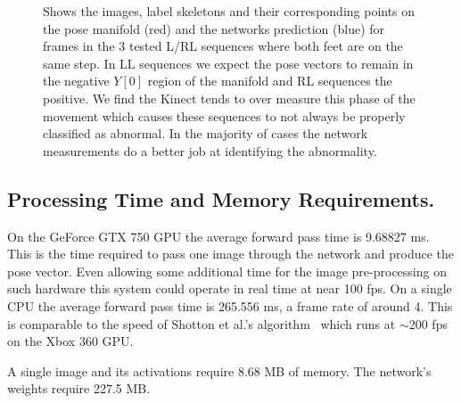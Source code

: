 \documentclass[11pt]{article} %
\begin{document}
\begin{figure}
\qquad%
\caption{Shows the images, label skeletons and their corresponding points on the pose manifold (red) and the networks prediction (blue) for frames in the 3 tested L/RL sequences where both feet are on the same step. In LL sequences we expect the pose vectors to remain in the negative $Y[0]$ region of the manifold and RL sequences the positive. We find the Kinect tends to over measure this phase of the movement which causes these sequences to not always be properly classified as abnormal. In the majority of cases the network measurements do a better job at identifying the abnormality. }
\label{fig:lrlOverMeasure}
\end{figure}


\subsection{Processing Time and Memory Requirements.}

On the GeForce GTX 750 GPU the average forward pass time is 9.68827 ms. This is the time required to pass one image through the network and produce the pose vector. Even allowing some additional time for the image pre-processing on such hardware this system could operate in real time at near 100 fps. On a single CPU the average forward pass time is 265.556 ms, a frame rate of around 4. This is comparable to the speed of Shotton et al.'s algorithm~\cite{Blake2011} which runs at $\sim$200 fps on the Xbox 360 GPU.

 A single image and its activations require 8.68 MB of memory. The network's weights require 227.5 MB. 
\end{document}

